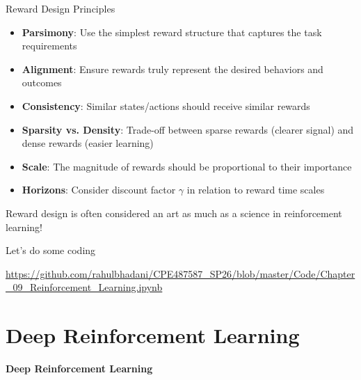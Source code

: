 \documentclass[aspectratio=169,xcolor=dvipsnames,svgnames,x11names,fleqn]{beamer}
\begin{document}
    \begin{frame}{Reward Design Principles}
        \footnotesize
    \begin{itemize}
        \item \textbf{Parsimony}: Use the simplest reward structure that captures the task requirements
        \item \textbf{Alignment}: Ensure rewards truly represent the desired behaviors and outcomes
        \item \textbf{Consistency}: Similar states/actions should receive similar rewards
        \item \textbf{Sparsity vs. Density}: Trade-off between sparse rewards (clearer signal) and dense rewards (easier learning)
        \item \textbf{Scale}: The magnitude of rewards should be proportional to their importance
        \item \textbf{Horizons}: Consider discount factor $\gamma$ in relation to reward time scales
    \end{itemize}
    
    \vspace{0.5cm}
    Reward design is often considered an art as much as a science in reinforcement learning!
    \end{frame}

    


\begin{frame}{Let's do some coding}
    \begin{center}
        \LARGE
        \url{https://github.com/rahulbhadani/CPE487587_SP26/blob/master/Code/Chapter_09_Reinforcement_Learning.ipynb}
    \end{center}
\end{frame}



\section{Deep Reinforcement Learning}

\begin{frame}{}
    \begin{center}
    \huge \bf \color{DarkBlue}
    Deep Reinforcement Learning
    
\end{center}

\end{frame}
\end{document}
